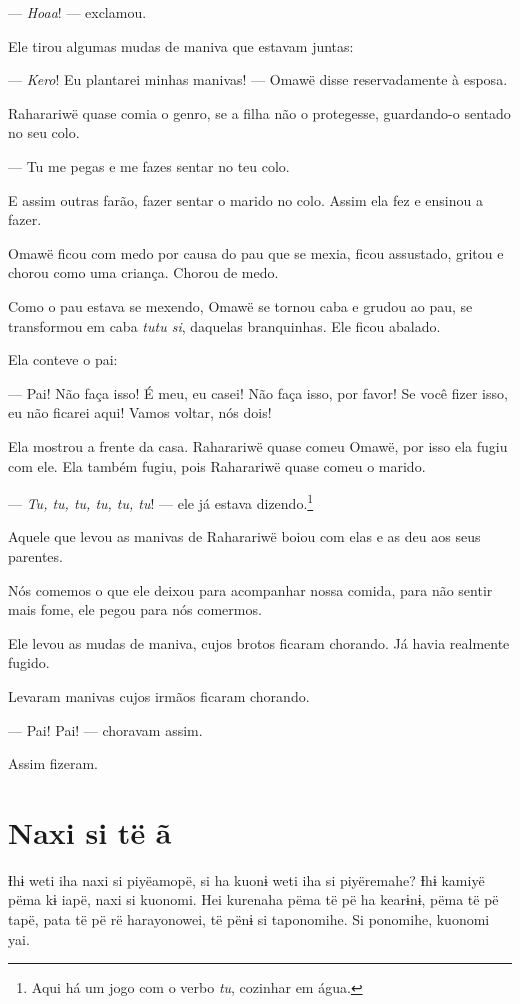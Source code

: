--- \textit{Hoaa}! --- exclamou. 

Ele tirou algumas mudas de maniva que estavam juntas:

--- \textit{Kero}! Eu plantarei minhas manivas! --- Omawë disse reservadamente à esposa. 

Raharariwë quase comia o genro, se a filha não o protegesse,
guardando-o sentado no seu colo. 

--- Tu me pegas e me fazes sentar no teu colo. 

E assim outras farão, fazer sentar o marido no colo. Assim ela fez e
ensinou a fazer. 

Omawë ficou com medo por causa do pau que se mexia, ficou assustado,
gritou e chorou como uma criança. Chorou de medo. 

Como o pau estava se mexendo, Omawë se tornou caba e grudou ao pau, se
transformou em caba \textit{tutu si}, daquelas branquinhas. Ele ficou
abalado. 

Ela conteve o pai: 

--- Pai! Não faça isso! É meu, eu casei! Não faça isso, por favor! Se
você fizer isso, eu não ficarei aqui! Vamos voltar, nós dois!

Ela mostrou a frente da casa. Raharariwë quase comeu Omawë, por isso ela
fugiu com ele. Ela também fugiu, pois Raharariwë quase comeu o marido. 

--- \textit{Tu, tu, tu, tu, tu, tu}! --- ele já estava dizendo.\footnote{Aqui há um jogo com o verbo \textit{tu}, cozinhar em água.}

Aquele que levou as manivas de Raharariwë boiou com elas e as deu aos
seus parentes. 

Nós comemos o que ele deixou para acompanhar nossa comida, para não
sentir mais fome, ele pegou para nós comermos. 

Ele levou as mudas de maniva, cujos brotos ficaram chorando. Já havia
realmente fugido. 

Levaram manivas cujos irmãos ficaram chorando. 

--- Pai! Pai! --- choravam assim. 

Assim fizeram.

\chapter{Naxi si të ã}

Ɨhɨ weti iha naxi si piyëamopë, si ha kuonɨ weti iha si piyëremahe? Ɨhɨ
kamiyë pëma kɨ iapë, naxi si kuonomi. Hei kurenaha pëma të pë ha
kearɨnɨ, pëma të pë tapë, pata të pë rë harayonowei, të pënɨ si
taponomihe. Si ponomihe, kuonomi yai. 


